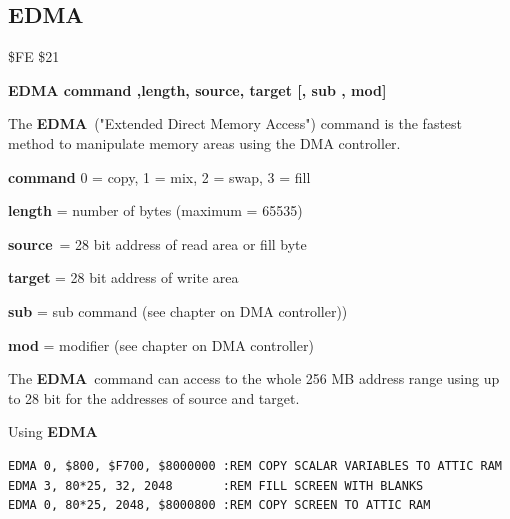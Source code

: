 \subsection{EDMA}
\label{BASIC 65 Commands!EDMA}
\begin{description}[leftmargin=2cm,style=nextline]
\item [Token:] \$FE \$21
\item [Format:] {\bf EDMA command ,length, source,
                 target [, sub , mod]}
\item [Usage:]
   The {\bf EDMA} ("Extended Direct Memory Access") command is the fastest method
   to manipulate memory areas using the DMA controller.

   {\bf command} 0 = copy, 1 = mix, 2 = swap, 3 = fill

   {\bf length} = number of bytes (maximum = 65535)

   {\bf source} = 28 bit address of read area or fill byte

   {\bf target} = 28 bit address of write area

   {\bf sub} = sub command (see chapter on DMA controller))

   {\bf mod} = modifier (see chapter on DMA controller)

\item [Remarks:]
The {\bf EDMA} command can access to the whole 256 MB address range
using up to 28 bit for the addresses of source and target.
\item [Example:] Using {\bf EDMA}
\begin{tcolorbox}[colback=black,coltext=white]
\verbatimfont{\codefont}
\begin{verbatim}
EDMA 0, $800, $F700, $8000000 :REM COPY SCALAR VARIABLES TO ATTIC RAM
EDMA 3, 80*25, 32, 2048       :REM FILL SCREEN WITH BLANKS
EDMA 0, 80*25, 2048, $8000800 :REM COPY SCREEN TO ATTIC RAM
\end{verbatim}
\end{tcolorbox}
\end{description}


\newpage
